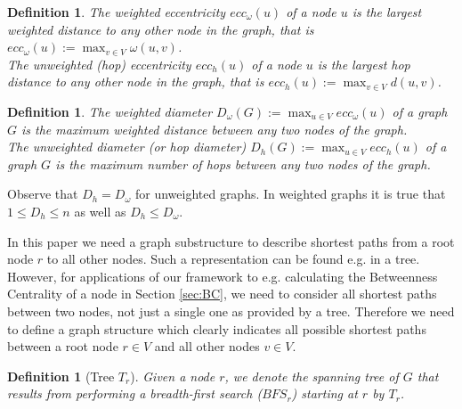 \documentclass[11pt]{article}
\newtheorem{definition}[theorem]{Definition}
\begin{document}
\begin{definition}
The weighted eccentricity $ecc_{\omega}\left(u\right)$ of a node $u$ is the largest weighted distance to any other node in the graph, that is $ecc_{\omega}\left(u\right):=\max_{v\in V} \omega\left(u,v\right)$.\\
The unweighted (hop) eccentricity $ecc_{h}\left(u\right)$ of a node $u$ is the largest hop distance to any other node in the graph, that is $ecc_{h}\left(u\right):=\max_{v\in V} d\left(u,v\right)$.
\end{definition}

\begin{definition}
The weighted diameter $D_{\omega}\left(G\right):=\max_{u\in V} ecc_{\omega}(u)$ of a graph $G$ is the maximum weighted distance between any two nodes of the graph.
\\ 
The unweighted diameter (or hop diameter) $D_{h}\left(G\right):=\max_{u\in V} ecc_{h}(u)$ of a graph $G$ is the maximum number of hops between any two nodes of the graph.
\end{definition}

Observe that $D_h=D_\omega$ for unweighted graphs. In weighted graphs it is true that $1\leq D_h\leq n$ as well as $D_{h}\leq D_\omega$.

In this paper we need a graph substructure to describe shortest paths from a root node $r$ to all other nodes. Such a representation can be found e.g. in a tree. However, for applications of our framework to e.g. calculating the Betweenness Centrality of a node in Section \ref{sec:BC}, we need to consider all shortest paths between two nodes, not just a single one as provided by a tree.
Therefore we need to define a graph structure which clearly indicates all possible shortest paths between a root node $r\in V$ and all other nodes $v\in V$. 


\begin{definition}[Tree $T_r$]
 Given a node $r$, we denote the spanning tree of $G$ that results from performing a breadth-first search ($BFS_r$) starting at $r$ by $T_r$.
\end{definition}
\end{document}
